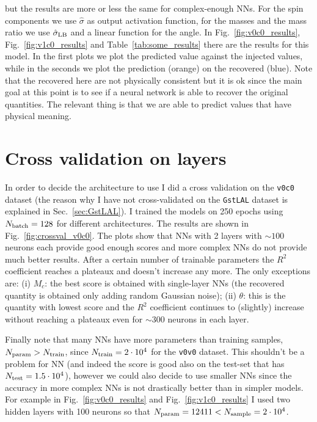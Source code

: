 \documentclass[prd,aps,twocolumn,a4paper,showkeys,nofootinbib]{revtex4-1}
\begin{document}
but the results are more or less the same for complex-enough NNs.
For the spin components we use $\hat{\sigma}$ as output 
activation function, for the masses and the mass ratio we use $\hat{\sigma}_{\rm LB}$ and
a linear function for the angle. 
In Fig.~\ref{fig:v0c0_results}, Fig.~\ref{fig:v1c0_results} and Table~\ref{tab:some_results}
there are the results for this model.
In the first plots we plot the predicted value against the injected values, while in the seconds
we plot the prediction (orange) on the recovered (blue). Note that the recovered here are not 
physically consistent but it is ok since the main goal at this point 
is to see if a neural network is able to 
recover the original quantities. The relevant thing is that we are able to predict values
that have physical meaning.

\section{Cross validation on layers}
\label{sec:crossval}
In order to decide the architecture to use I did a cross validation on the 
\texttt{v0c0} dataset (the reason why I have not cross-validated on the \texttt{GstLAL} dataset
is explained in Sec.~\ref{sec:GstLAL}). I trained the models on 250 epochs using
$N_{\rm batch}=128$ for different architectures. The results are shown 
in Fig.~\ref{fig:crossval_v0c0}. The plots show that NNs with 2 layers with $\sim 100$ 
neurons each provide good enough scores and more complex NNs do not provide much better results. 
After a certain number of trainable parameters the $R^2$ coefficient reaches a plateaux 
and doesn't increase any more. 
The only exceptions are: (i) $M_c$: the best score is obtained with single-layer NNs 
(the recovered quantity is obtained only adding random Gaussian noise); 
(ii) $\theta$: this is the quantity with lowest score and the $R^2$ coefficient 
continues to (slightly) increase without reaching a plateaux even for $\sim 300$
neurons in each layer. 

Finally note that many NNs have more parameters than training samples, 
$N_{\rm param}>N_{\rm train}$, since 
$N_{\rm train}=2\cdot 10^4$ for the \texttt{v0v0} dataset. This shouldn't be a problem 
for NN (and indeed the score is good also on the test-set that has 
$N_{\rm test}=1.5\cdot 10^4$), however we could also decide to use smaller NNs 
since the accuracy in more complex NNs is not drastically better than in simpler models. 
For example in Fig.~\ref{fig:v0c0_results} and Fig.~\ref{fig:v1c0_results} I used
two hidden layers with 100 neurons so that $N_{\rm param}=12411<N_{\rm sample}=2\cdot 10^4$.
\end{document}
